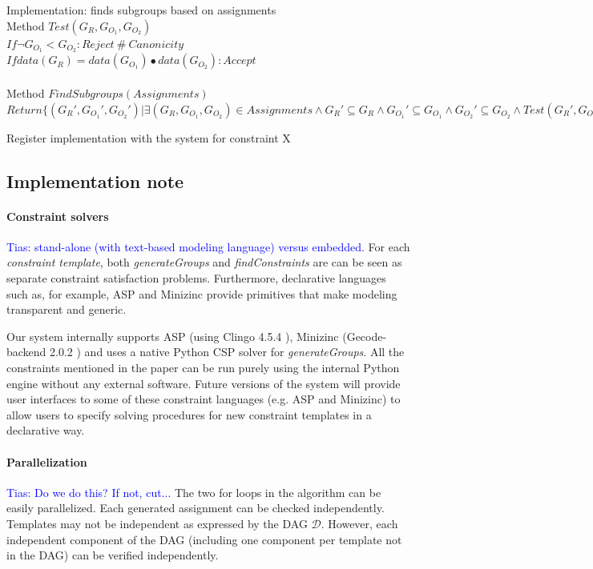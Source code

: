 \documentclass{sig-alternate-05-2015}
\newcommand{\tias}[1]{\textcolor{blue}{{\sc Tias:} #1}\xspace}
\newcommand{\format}[1]{\textit{#1}\xspace}
\newcommand{\generategroups}{\format{generateGroups}}
\newcommand{\findassignment}{\format{findConstraints}}
\newcommand{\template}{\format{constraint template}}
\newcommand{\dependencies}{\ensuremath{\mathcal{D}}\xspace}
\begin{document}
Implementation: finds subgroups based on assignments\\
Method $Test(G_R, G_{O_1}, G_{O_2})$\\
$If \lnot G_{O_1} < G_{O_2}: Reject~\#~Canonicity$\\
$If data(G_R) = data(G_{O_1}) \bullet data(G_{O_2}): Accept$
\\\\
Method $FindSubgroups(Assignments)$\\
$Return \{ (G_R', G_{O_1}', G_{O_2}') | \exists (G_R, G_{O_1}, G_{O_2}) \in Assignments \land G_R' \subseteq G_R \land G_{O_1}' \subseteq G_{O_1} \land G_{O_2}' \subseteq G_{O_2} \land Test(G_R', G_{O_1}', G_{O_2}') \}$

Register implementation with the system for constraint X

\subsection{Implementation note}

\paragraph{Constraint solvers}
\tias{stand-alone (with text-based modeling language) versus embedded.}
For each \template, both \generategroups and \findassignment are can be seen as separate constraint satisfaction problems.
Furthermore, declarative languages such as, for example, ASP \cite{whaisasp} and Minizinc \cite{minizinc} provide primitives that make modeling transparent and generic.

Our system internally supports ASP (using Clingo 4.5.4 \cite{clingo}), Minizinc (Gecode-backend 2.0.2 \cite{minizinc}) and uses a native Python CSP solver \cite{python_constraint} for \generategroups.
All the constraints mentioned in the paper can be run purely using the internal Python engine without any external software.
Future versions of the system will provide user interfaces to some of these constraint languages (e.g. ASP and Minizinc) to allow users to specify solving procedures for new constraint templates in a declarative way.

\paragraph{Parallelization}
\tias{Do we do this? If not, cut...}
The two for loops in the algorithm can be easily parallelized. Each generated assignment can be checked independently. Templates may not be independent as expressed by the DAG \dependencies. However, each independent component of the DAG (including one component per template not in the DAG) can be verified independently. 
\end{document}
